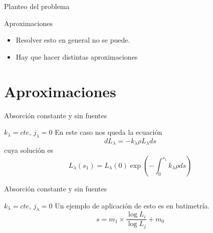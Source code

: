\documentclass[]{beamer}
\begin{document}
\begin{frame}{Planteo del problema}
  \begin{alertblock}{Aproximaciones}
    \begin{itemize}[<+->]
      \item Resolver esto en general no se puede.
      \item Hay que hacer distintas aproximaciones
    \end{itemize}
  \end{alertblock}
\end{frame}

\section{Aproximaciones}

\begin{frame}{Absorción constante y sin fuentes}
  \begin{exampleblock}{$k_\lambda = cte$, $j_\lambda = 0$}
    En este caso nos queda la ecuación
    \begin{equation}
        dL_\lambda = -k_\lambda \rho L_\lambda ds
    \end{equation}
    \pause cuya solución es
    \begin{equation}
        L_\lambda(s_1) = L_\lambda(0) \exp\left( -\int_0^{s_1} k_\lambda \rho ds \right)
    \end{equation}
  \end{exampleblock}
\end{frame}

\begin{frame}{Absorción constante y sin fuentes}
  \begin{exampleblock}{$k_\lambda = cte$, $j_\lambda = 0$}
    Un ejemplo de aplicación de esto es en batimetría.
    \begin{equation}
      s = m_1\times \frac{\log L_i}{\log L_j}+m_0
    \end{equation}
  \end{exampleblock}
\end{frame}
\end{document}
